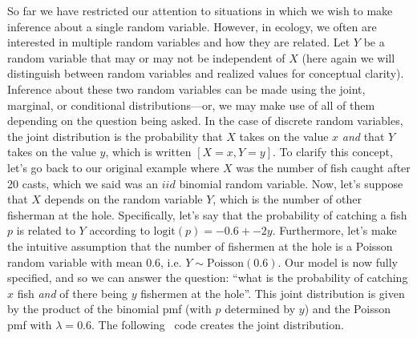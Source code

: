 So far we have restricted our attention to situations in which we wish
to make inference about a single random variable.
However, in ecology, we often are interested in multiple random
variables and how they are related. Let $Y$ be a random variable
that may or may not be independent of $X$ (here again we will
distinguish between random variables and realized values for
conceptual clarity). Inference
about these two random variables can be made using the joint,
marginal, or conditional distributions---or, we may make use of all of
them depending on the question being asked. In the case of
discrete random variables, the joint
distribution is the probability that $X$ takes on the value $x$
\textit{and} that $Y$ takes on the value $y$, which is written
$[X=x,Y=y]$. To clarify this concept, let's go back to our original
example where $X$ was the number of fish caught after 20 casts, which
we said was an $iid$ binomial random variable. Now,
let's suppose that $X$ depends on the random variable $Y$, which is
the number of other fisherman at the hole. Specifically, let's say
that the probability of catching a fish $p$ is related to $Y$
according to $\text{logit}(p) = -0.6 + -2y$. Furthermore, let's
make the intuitive assumption that the number of fishermen at the hole
is a Poisson random variable with mean $0.6$, i.e. $Y \sim
\text{Poisson}(0.6)$. Our model is now fully specified, and so we can
answer the question: ``what is the probability of catching $x$ fish
\textit{and} of there being $y$ fishermen at the hole''. This joint
distribution is given by the product of the binomial pmf (with $p$
determined by $y$) and the Poisson pmf with $\lambda=0.6$. The
following \R~code creates the joint distribution.

